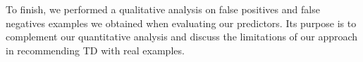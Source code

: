 To finish, we performed a qualitative analysis on false positives and false negatives examples we obtained when evaluating our predictors. Its purpose is to complement our quantitative analysis and discuss the limitations of our approach in recommending \ac{TD} with real examples.
























